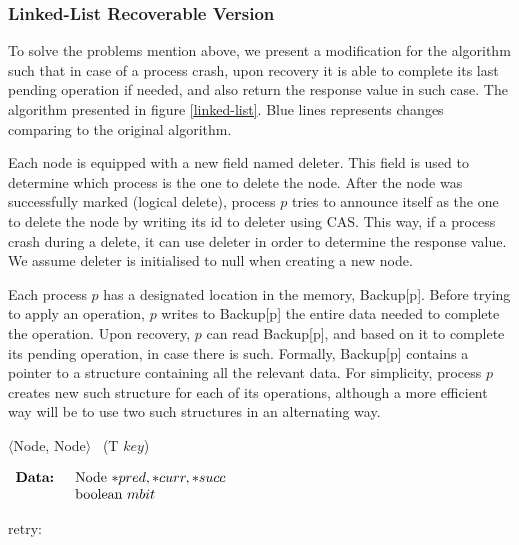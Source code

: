 \subsubsection{Linked-List Recoverable Version}

To solve the problems mention above, we present a modification for the algorithm such that in case of a process crash, upon recovery it is able to complete its last pending operation if needed, and also return the response value in such case. The algorithm presented in figure \ref{linked-list}. Blue lines represents changes comparing to the original algorithm.

Each node is equipped with a new field named deleter. This field is used to determine which process is the one to delete the node. After the node was successfully marked (logical delete), process $p$ tries to announce itself as the one to delete the node by writing its id to deleter using CAS. This way, if a process crash during a delete, it can use deleter in order to determine the response value. We assume deleter is initialised to null when creating a new node.

Each process $p$ has a designated location in the memory, Backup[p]. Before trying to apply an operation, $p$ writes to Backup[p] the entire data needed to complete the operation. Upon recovery, $p$ can read Backup[p], and based on it to complete its pending operation, in case there is such. Formally, Backup[p] contains a pointer to a structure containing all the relevant data.
For simplicity, process $p$ creates new such structure for each of its operations, although a more efficient way will be to use two such structures in an alternating way. 


\begin{algorithm}[b]
	\footnotesize
	
	\caption{$\langle$Node, Node$\rangle$ \search\ (T $key$)}
	
	$ \begin{array}{rl}
	\mbox{\textbf{Data: }}	&	\mbox{Node $*pred, *curr, *succ$} \\
							&	\mbox{boolean $mbit$}
	\end{array} $
	
	
	retry: 
	
\end{algorithm}

